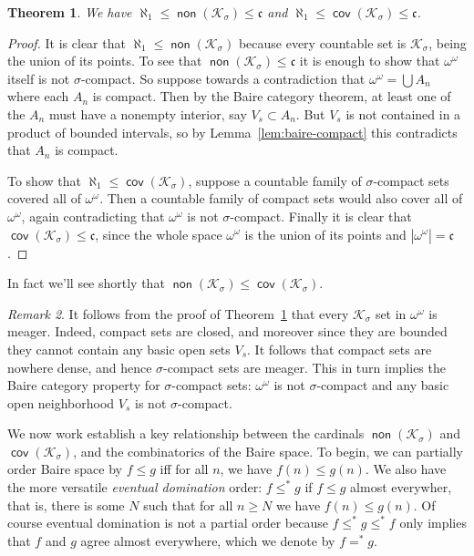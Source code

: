 \documentclass[11pt,oneside]{amsbook}
\newcommand{\Ksigma}{\mathcal K_\sigma}
\DeclareMathOperator{\non}{\mathsf{non}}
\DeclareMathOperator{\cov}{\mathsf{cov}}
\theoremstyle{definition}
\theoremstyle{plain}
\newtheorem{thm}{Theorem}[section]
\theoremstyle{definition}
\theoremstyle{remark}
\newtheorem{rem}[thm]{Remark}
\numberwithin{equation}{section}
\numberwithin{figure}{section}
\begin{document}
\begin{thm}
  \label{thm:k-sigma}
  We have $\aleph_1\leq\non(\Ksigma)\leq\mathfrak c$ and $\aleph_1\leq\cov(\Ksigma)\leq\mathfrak c$.
\end{thm}

\begin{proof}
  It is clear that $\aleph_1\leq\non(\Ksigma)$ because every countable set is $\Ksigma$, being the union of its points. To see that $\non(\Ksigma)\leq\mathfrak c$ it is enough to show that $\omega^\omega$ itself is not $\sigma$-compact. So suppose towards a contradiction that $\omega^\omega=\bigcup A_n$ where each $A_n$ is compact. Then by the Baire category theorem, at least one of the $A_n$ must have a nonempty interior, say $V_s\subset A_n$. But $V_s$ is not contained in a product of bounded intervals, so by Lemma~\ref{lem:baire-compact} this contradicts that $A_n$ is compact.

  To show that $\aleph_1\leq\cov(\Ksigma)$, suppose a countable family of $\sigma$-compact sets covered all of $\omega^\omega$. Then a countable family of compact sets would also cover all of $\omega^\omega$, again contradicting that $\omega^\omega$ is not $\sigma$-compact. Finally it is clear that $\cov(\Ksigma)\leq\mathfrak c$, since the whole space $\omega^\omega$ is the union of its points and $|\omega^\omega|=\mathfrak c$.
\end{proof}

In fact we'll see shortly that $\non(\Ksigma)\leq\cov(\Ksigma)$.

\begin{rem}
  \label{rem:ksigma-meager}
  It follows from the proof of Theorem~\ref{thm:k-sigma} that every $\Ksigma$ set in $\omega^\omega$ is meager. Indeed, compact sets are closed, and moreover since they are bounded they cannot contain any basic open sets $V_s$. It follows that compact sets are nowhere dense, and hence $\sigma$-compact sets are meager. This in turn implies the Baire category property for $\sigma$-compact sets: $\omega^\omega$ is not $\sigma$-compact and any basic open neighborhood $V_s$ is not $\sigma$-compact.
\end{rem}

We now work establish a key relationship between the cardinals $\non(\Ksigma)$ and $\cov(\Ksigma)$, and the combinatorics of the Baire space. To begin, we can partially order Baire space by $f\leq g$ iff for all $n$, we have $f(n)\leq g(n)$. We also have the more versatile \emph{eventual domination} order: $f\leq^*g$ if $f\leq g$ almost everywher, that is, there is some $N$ such that for all $n\geq N$ we have $f(n)\leq g(n)$. Of course eventual domination is not a partial order because $f\leq^*g\leq^*f$ only implies that $f$ and $g$ agree almost everywhere, which we denote by $f=^*g$.
\end{document}
